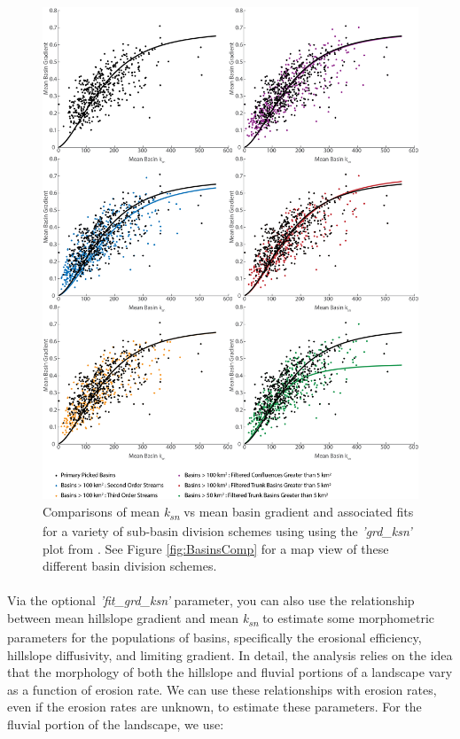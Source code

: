 \begin{figure}[H]
	\centering
	\includegraphics[width=13cm]{PNGs/grd_ksn_basinCompare.png}
	\caption{Comparisons of mean \textit{k\textsubscript{sn}} vs mean basin gradient and associated fits  for a variety of sub-basin division schemes using  using the \textit{'grd\_ksn'} plot from . See Figure \ref{fig:BasinsComp} for a map view of these different basin division schemes.}
	\label{fig:GrdKsnComp}
\end{figure}


\paragraph{}Via the optional \textit{'fit\_grd\_ksn'} parameter, you can also use the relationship between mean hillslope gradient and mean \textit{k\textsubscript{sn}} to estimate some morphometric parameters for the populations of basins, specifically the erosional efficiency, hillslope diffusivity, and limiting gradient. In detail, the analysis relies on the idea that the morphology of both the hillslope and fluvial portions of a landscape vary as a function of erosion rate. We can use these relationships with erosion rates, even if the erosion rates are unknown, to estimate these parameters. For the fluvial portion of the landscape, we use:

